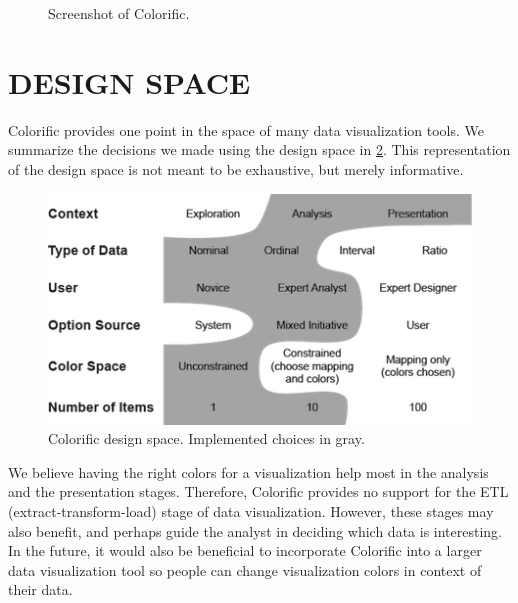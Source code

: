 \documentclass{article}
\newcommand{\system}{Colorific\xspace}
\begin{document}
\begin{figure}[htb]
\label{screenshot}
\caption{Screenshot of \system.}
\end{figure}

\section{DESIGN SPACE}
\system provides one point in the space of many data visualization tools. We summarize the decisions we made using the design space in \ref{design-space}. This representation of the design space is not meant to be exhaustive, but merely informative. 

\begin{figure}[htb]
\label{design-space}
\includegraphics{design_space.png}
\caption{\system design space. Implemented choices in gray.}
\end{figure}
 We believe having the right colors for a visualization help most in the analysis and the presentation stages. Therefore, \system provides no support for the ETL (extract-transform-load) stage of data visualization. However, these stages may also benefit, and perhaps guide the analyst in deciding which data is interesting. In the future, it would also be beneficial to incorporate \system into a larger data visualization tool so people can change visualization colors in context of their data.
\end{document}
